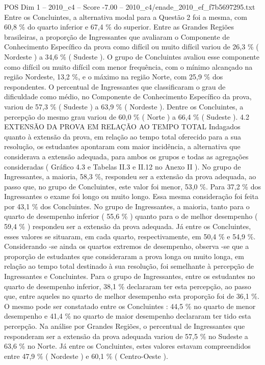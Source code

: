 \begin{textsample}{POS Dim 1 – 2010\_c4 – Score -7.00 – 2010\_c4/enade\_2010\_ef\_f7b5697295.txt}
Entre os Concluintes, a alternativa modal para a Questão 2 foi a mesma, com 60,8 \% do quarto inferior e 67,4 \% do superior.
Entre as Grandes Regiões brasileiras, a proporção de Ingressantes que avaliaram o Componente de Conhecimento Específico da prova como difícil ou muito difícil variou de 26,3 \% ( Nordeste ) a 34,6 \% ( Sudeste ).
O grupo de Concluintes avaliou esse componente como difícil ou muito difícil com menor frequência, com o mínimo alcançado na região Nordeste, 13,2 \%, e o máximo na região Norte, com 25,9 \% dos respondentes.
O percentual de Ingressantes que classificaram o grau de dificuldade como médio, no Componente de Conhecimento Específico da prova, variou de 57,3 \% ( Sudeste ) a 63,9 \% ( Nordeste ).
Dentre os Concluintes, a percepção do mesmo grau variou de 60,0 \% ( Norte ) a 66,4 \% ( Sudeste ). 4.2 EXTENSÃO DA PROVA EM RELAÇÃO AO TEMPO TOTAL Indagados quanto à extensão da prova, em relação ao tempo total oferecido para a sua resolução, os estudantes apontaram com maior incidência, a alternativa que considerava a extensão adequada, para ambos os grupos e todas as agregações consideradas ( Gráfico 4.3 e Tabelas II.3 e II.12 no Anexo II ).
No grupo de Ingressantes, a maioria, 58,3 \%, respondeu ser a extensão da prova adequada, ao passo que, no grupo de Concluintes, este valor foi menor, 53,0 \%.
Para 37,2 \% dos Ingressantes o exame foi longo ou muito longo.
Essa mesma consideração foi feita por 43,1 \% dos Concluintes.
No grupo de Ingressantes, a maioria, tanto para o quarto de desempenho inferior ( 55,6 \% ) quanto para o de melhor desempenho ( 59,4 \% ) respondeu ser a extensão da prova adequada.
Já entre os Concluintes, esses valores se situaram, em cada quarto, respectivamente, em 50,4 \% e 54,9 \%.
Considerando -se ainda os quartos extremos de desempenho, observa -se que a proporção de estudantes que consideraram a prova longa ou muito longa, em relação ao tempo total destinado à sua resolução, foi semelhante à percepção de Ingressantes e Concluintes.
Para o grupo de Ingressantes, entre os estudantes no quarto de desempenho inferior, 38,1 \% declararam ter esta percepção, ao passo que, entre aqueles no quarto de melhor desempenho esta proporção foi de 36,1 \%.
O mesmo pode ser constatado entre os Concluintes : 44,5 \% no quarto de menor desempenho e 41,4 \% no quarto de maior desempenho declararam ter tido esta percepção.
Na análise por Grandes Regiões, o percentual de Ingressantes que responderam ser a extensão da prova adequada variou de 57,5 \% no Sudeste a 63,6 \% no Norte.
Já entre os Concluintes, estes valores estavam compreendidos entre 47,9 \% ( Nordeste ) e 60,1 \% ( Centro-Oeste ).

\end{textsample}
